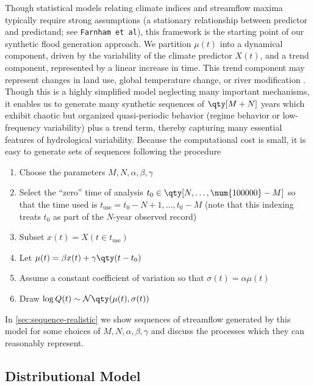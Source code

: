 \documentclass[11pt]{article}
\begin{document}
Though statistical models relating climate indices and streamflow maxima typically require strong assumptions (\ie a stationary relationship between predictor and predictand; see \texttt{Farnham et al}), this framework is the starting point of our synthetic flood generation approach.
We partition $\mu(t)$ into a dynamical component, driven by the variability of the climate predictor $X(t)$, and a trend component, represented by a linear increase in time.
This trend component may represent changes in land use, global temperature change, or river modification \citep[see][]{Merz2014}.
Though this is a highly simplified model neglecting many important mechanisms, it enables us to generate many synthetic sequences of $\qty[M + N]$ years which exhibit chaotic but organized quasi-periodic behavior (regime behavior or low-frequency variability) plus a trend term, thereby capturing many essential features of hydrological variability.
Because the computational cost is small, it is easy to generate sets of sequences following the procedure
\begin{enumerate}
  \item Choose the parameters $M,N,\alpha,\beta,\gamma$
  \item Select the ``zero'' time of analysis $t_0 \in \qty[N, \ldots, \num{100000} - M]$ so that the time used is $t_{\text{use}} = t_0 - N + 1, \ldots, t_0 - M$ (note that this indexing treats $t_0$ as part of the $N$-year observed record)
  \item Subset $x(t) = X(t \in t_{\text{use}})$
  \item Let $\mu(t) = \beta x(t) + \gamma \qty(t - t_0)$
  \item Assume a constant coefficient of variation so that $\sigma(t) = \alpha \mu(t)$
  \item Draw $\log Q(t) \sim \normal \qty(\mu(t), \sigma(t))$
\end{enumerate}

In \cref{sec:sequence-realistic} we show sequences of streamflow generated by this model for some choices of $M,N,\alpha,\beta,\gamma$ and discuss the processes which they can reasonably represent.

\subsection{Distributional Model \label{sec:estimation}}
\end{document}

